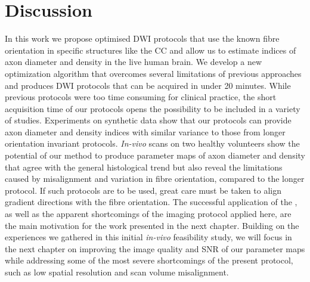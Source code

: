 \section{Discussion}
In this work we propose optimised {\gls{DWI}} protocols that use the known fibre orientation in specific structures like the \gls{CC} and allow us to estimate indices of axon diameter and density in the live human brain. We develop a new optimization algorithm that overcomes several limitations of previous approaches and produces DWI protocols that can be acquired in under 20 minutes. While previous protocols were too time consuming for clinical practice, the short acquisition time of our protocols opens the possibility to be included in a variety of studies. Experiments on synthetic data show that our protocols can provide axon diameter and density indices with similar variance to those from longer orientation invariant protocols. \emph{In-vivo} scans on two healthy volunteers show the potential of our method to produce parameter maps of axon diameter and density that agree with the general histological trend but also reveal the limitations caused by misalignment and variation in fibre orientation, compared to the longer {\OI} protocol. If such protocols are to be used, great care must be taken to align gradient directions with the fibre orientation. The successful application of the {\SF}, as well as the apparent shortcomings of the imaging protocol applied here, are the main motivation for the work presented in the next chapter. Building on the experiences we gathered in this initial \emph{in-vivo} feasibility study, we will focus in the next chapter on improving the image quality and \gls{SNR} of our parameter maps while addressing some of the most severe shortcomings of the present protocol, such as low spatial resolution and scan volume misalignment.
